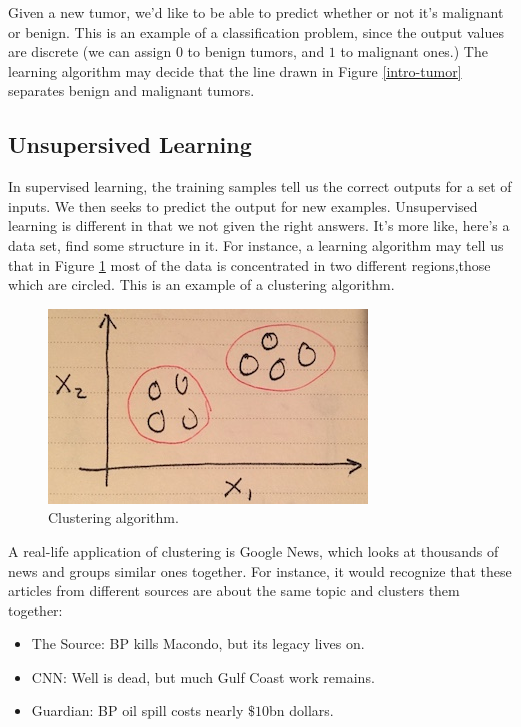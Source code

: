 \documentclass{article}
\begin{document}
Given a new tumor, we'd like to be able to predict whether or not it's malignant or benign. This is an example of a classification problem, since the output values are discrete (we can assign $0$ to benign tumors, and $1$ to malignant ones.) The learning algorithm may decide that the line drawn in Figure \ref{intro-tumor} separates benign and malignant tumors.

\subsection{Unsupersived Learning}
In supervised learning, the training samples tell us the correct outputs for a set of inputs. We then seeks to predict the output for new examples. Unsupervised learning is different in that we not given the right answers. It's more like, here's a data set, find some structure in it. For instance, a learning algorithm may tell us that in Figure \ref{intro-clustering} most of the data is concentrated in two different regions,those which are circled. This is an example of a clustering algorithm.

\begin{figure}[ht]
\centering
\includegraphics[scale=0.8]{images/intro/clustering.jpg}
\caption{Clustering algorithm.}
\label{intro-clustering}
\end{figure}

A real-life application of clustering is Google News, which looks at thousands of news and groups similar ones together. For instance, it would recognize that these articles from different sources are about the same topic and clusters them together:

\begin{itemize}
    \item The Source: BP kills Macondo, but its legacy lives on.
    \item CNN: Well is dead, but much Gulf Coast work remains.
    \item Guardian: BP oil spill costs nearly $\$10$bn dollars.
\end{itemize}
\end{document}
